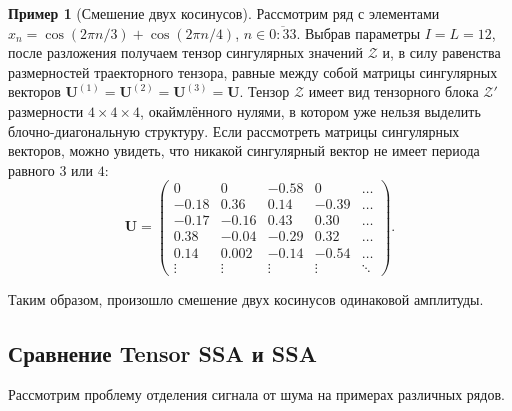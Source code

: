 \documentclass[specialist,
    substylefile = spbu_report.rtx,
    subf,href,colorlinks=true, 12pt]{disser}
\theoremstyle{plain}
\theoremstyle{definition}
\newtheorem{example}{Пример}[section]
\theoremstyle{remark}
\begin{document}
    \begin{example}[Смешение двух косинусов]
        Рассмотрим ряд с элементами $x_n=\cos(2\pi n/3) + \cos(2\pi n/4)$, $n\in\overline{0:33}$.
        Выбрав параметры $I=L=12$, после разложения получаем тензор сингулярных значений $\mathcal{Z}$ и, в силу равенства размерностей
        траекторного тензора, равные между собой матрицы сингулярных векторов $\mathbf{U}^{(1)}=\mathbf{U}^{(2)}=\mathbf{U}^{(3)}=\mathbf{U}$.
        Тензор $\mathcal{Z}$ имеет вид тензорного блока $\mathcal{Z}'$ размерности $4\times 4\times 4$, окаймлённого нулями, в
        котором уже нельзя выделить блочно-диагональную структуру.
        Если рассмотреть матрицы сингулярных векторов, можно увидеть, что никакой сингулярный вектор не имеет периода равного $3$ или $4$:
        \[
            \mathbf{U}=
            \begin{pmatrix}
                0      & 0      & -0.58  & 0      & \ldots \\
                -0.18  & 0.36   & 0.14   & -0.39  & \ldots \\
                -0.17  & -0.16  & 0.43   & 0.30   & \ldots \\
                0.38   & -0.04  & -0.29  & 0.32   & \ldots \\
                0.14   & 0.002  & -0.14  & -0.54  & \ldots \\
                \vdots & \vdots & \vdots & \vdots & \ddots
            \end{pmatrix}.
        \]

        Таким образом, произошло смешение двух косинусов одинаковой амплитуды.
    \end{example}

    \subsection{Сравнение Tensor SSA и SSA}\label{subsec:comparison}
    Рассмотрим проблему отделения сигнала от шума на примерах различных рядов.
\end{document}
